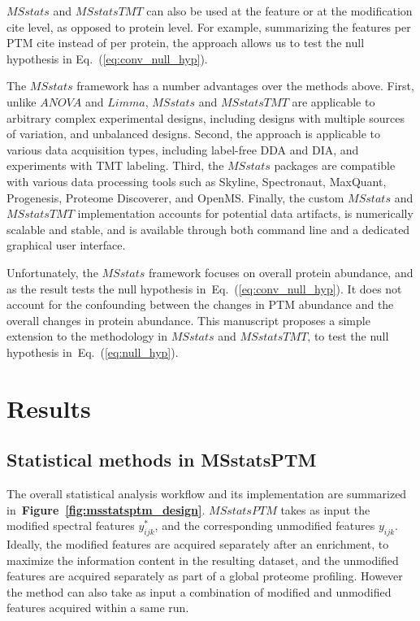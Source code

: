 \documentclass[mcp]{article}
\numberwithin{table}{section}
\def\eqref#1{Eq.~(\ref{eq:#1})}
\def\figref#1{{\bf Figure~\ref{fig:#1}}}
\begin{document}
$MSstats$ and $MSstatsTMT$ can  also be used at the feature or at the modification cite level, as opposed to protein level. For example, summarizing the features per PTM cite instead of per protein, the approach allows us to test the null hypothesis in \eqref{conv_null_hyp}.

The $MSstats$ framework has a number advantages over the methods above. 
First, unlike $ANOVA$ and $Limma$, $MSstats$ and $MSstatsTMT$ are applicable to arbitrary complex experimental designs, including designs with multiple sources of variation, and unbalanced designs. 
Second, the approach is applicable to various data acquisition types, including label-free DDA and DIA, and experiments with TMT labeling. 
Third, the $MSstats$ packages are compatible with various data processing tools such as Skyline, Spectronaut, MaxQuant, Progenesis, Proteome Discoverer, and OpenMS. 
Finally, the custom $MSstats$ and $MSstatsTMT$ implementation accounts for potential data artifacts, is numerically scalable and stable, and is available through both command line and a dedicated graphical user interface.

Unfortunately, the $MSstats$ framework focuses on overall protein abundance, and as the result tests the null hypothesis in~\eqref{conv_null_hyp}. It does not account for the confounding between the changes in PTM abundance and the overall changes in protein abundance. This manuscript proposes a simple extension to the methodology in $MSstats$ and $MSstatsTMT$, to test the null hypothesis in~\eqref{null_hyp}.

\section{Results}

\subsection*{Statistical methods in MSstatsPTM}
\label{sec:adjustment_summary}

\medskip {}

\medskip \noindent
The overall statistical analysis workflow and its implementation are summarized in~\figref{msstatsptm_design}. $MSstatsPTM$ takes as input the modified spectral features $y_{ijk}^{\ast}$, and the corresponding unmodified features $y_{ijk}$. Ideally, the modified features are acquired separately after an enrichment, to maximize the information content in the resulting dataset, and the unmodified features are acquired separately as part of a global proteome profiling. However the method can also take as input a combination of modified and unmodified features acquired within a same run. 
\end{document}
